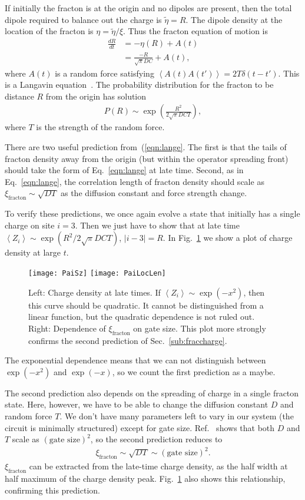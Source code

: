 \documentclass[a4paper,11pt]{article}
\newcommand{\nd}[2]{\frac{d #1}{d #2}}
\newcommand{\ex}[1]{\left\langle #1 \right\rangle}
\newcommand{\note}[1]{{\color{red}{#1}}}
\begin{document}
If initially the fracton is at the origin and no dipoles are present, then the total dipole required to balance out the charge is $\tilde{\eta}=R$. The dipole density at the location of the fracton is $\eta = \tilde{\eta}/\xi$. Thus the fracton equation of motion is
\begin{align}
\nd{R}{t} &= -\eta(R) + A(t)\\
&= \frac{-R}{\sqrt{\pi} DC}+ A(t),
\end{align}
where $A(t)$ is a random force satisfying $\ex{A(t)A(t')} = 2T\delta(t-t')$. \note{The units are wonky here.} This is a Langavin equation~\cite{MarenduAsp}. The probability distribution for the fracton to be distance $R$ from the origin has solution
\begin{align}
P(R) \sim \exp\left(\frac{R^2}{2\sqrt{\pi}DCT}\right), \label{eqn:lange}
\end{align}
where $T$ is the strength of the random force. 

There are two useful prediction from~(\ref{eqn:lange}. The first is that the tails of fracton density away from the origin (but within the operator spreading front) should take the form of Eq.~\ref{eqn:lange} at late time. Second, as in Eq.~\ref{eqn:lange}, the correlation length of fracton density should scale as $\xi_\text{fracton}\sim \sqrt{DT}$ as the diffusion constant and force strength change. 

To verify these predictions, we once again evolve a state that initially has a single charge on site $i=3$. Then we just have to show that at late time $\ex{Z_i}\sim\exp(R^2/2\sqrt{\pi}DCT)$, $|i-3|=R$. 
In Fig.~\ref{fig:PaiSz} we show a plot of charge density at large $t$. 
\begin{figure}
	\centering
	\texttt{[image: PaiSz]}
	\texttt{[image: PaiLocLen]}
	\caption{Left: Charge density at late times. If $\ex{Z_i}\sim\exp(-x^2)$, then this curve should be quadratic. It cannot be distinguished from a linear function, but the quadratic dependence is not ruled out. Right: Dependence of $\xi_\text{fracton}$ on gate size. This plot more strongly confirms the second prediction of Sec.~\ref{sub:fraccharge}.}
	\label{fig:PaiSz}
\end{figure}
The exponential dependence means that we can not distinguish between $\exp(-x^2)$ and $\exp(-x)$, so we count the first prediction as a maybe. 

The second prediction also depends on the spreading of charge in a single fracton state. Here, however, we have to be able to change the diffusion constant $D$ and random force $T$. We don't have many parameters left to vary in our system (the circuit is minimally structured) except for gate size. Ref.~\cite{PaiFracton} shows that both $D$ and $T$ scale as $(\text{gate size})^2$, so the second prediction reduces to
\begin{align}
\xi_\text{fracton}\sim\sqrt{DT}\sim(\text{gate size})^2.
\end{align}
$\xi_\text{fracton}$ can be extracted from the late-time charge density, as the half width at half maximum of the charge density peak.
Fig.~\ref{fig:PaiSz} also shows this relationship, confirming this prediction.
\end{document}
